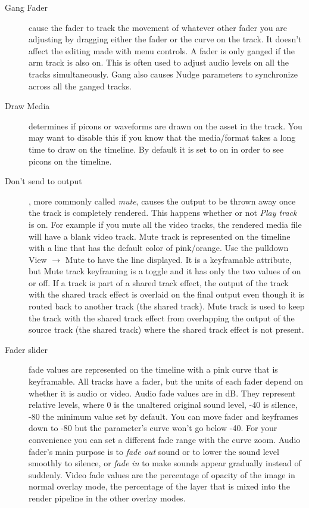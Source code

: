 \begin{description}
    \item[Gang Fader] cause the fader to track the movement of whatever other fader you are adjusting by dragging either the fader or the curve on the track.  It doesn't affect the editing made with menu controls.  A fader is only ganged if the arm track is also on.  This is often used to adjust audio levels on all the tracks simultaneously.  Gang also causes Nudge parameters to synchronize across all the ganged tracks.
    \item[Draw Media] determines if picons or waveforms are drawn on the asset in the track.  You may want to disable this if you know that the media/format takes a long time to draw on the timeline.  By default it is set to on in order to see picons on the timeline.
    \item[Don’t send to output] , more commonly called \textit{mute}, causes the output to be thrown away once the track is completely rendered. This happens whether or not \textit{Play track} is on.  For example if you mute all the video tracks, the rendered media file will have a blank video track.  Mute track is represented on the timeline with a line that has the default color of pink/orange.  Use the pulldown View $\rightarrow$ Mute to have the line displayed.  It is a keyframable attribute, but Mute track keyframing is a toggle and it has only the two values of on or off. If a track is part of a shared track effect, the output of the track with the shared track effect is overlaid on the final output even though it is routed back to another track (the shared track).  Mute track is used to keep the track with the shared track effect from overlapping the output of the source track (the shared track) where the shared track effect is not present.
    \item[Fader slider] fade values are represented on the timeline with a pink curve that is keyframable.  All tracks have a fader, but the units of each fader depend on whether it is audio or video.  Audio fade values are in dB. They represent relative levels, where 0 is the unaltered original sound level, -40 is silence, -80 the minimum value set by default.  You can move fader and keyframes down to -80 but the parameter's curve won't go below -40.  For your convenience you can set a different fade range with the curve zoom.  Audio fader’s main purpose is to \textit{fade out} sound or to lower the sound level smoothly to silence, or \textit{fade in} to make sounds appear gradually instead of suddenly.  Video fade values are the percentage of opacity of the image in normal overlay mode, the percentage of the layer that is mixed into the render pipeline in the other overlay modes.

\end{description}
